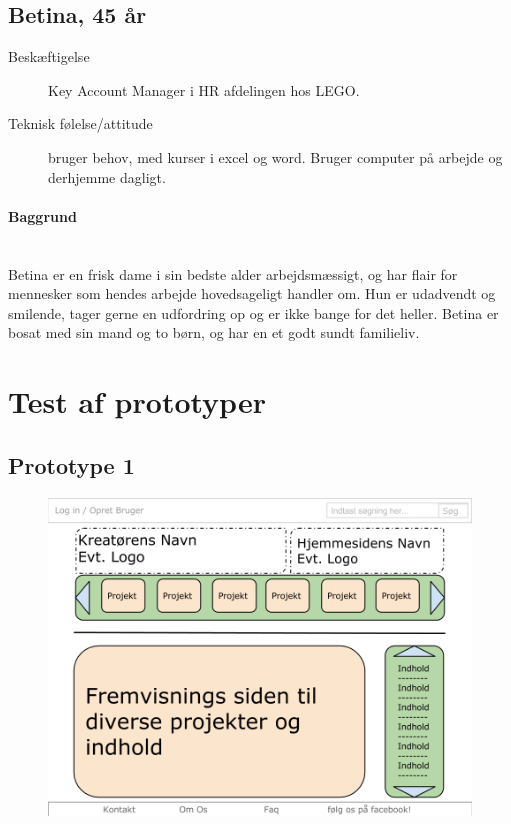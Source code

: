 \documentclass[a4paper,titlepage,fleqn,12pt]{article}
\begin{document}
\subsection{Betina, 45 år}
\begin{description}
	\item[Beskæftigelse] Key Account Manager i HR afdelingen hos LEGO. \item[Teknisk følelse/attitude] bruger behov, med kurser i excel og word. Bruger computer på arbejde og derhjemme dagligt.
\end{description}
\paragraph{Baggrund}\hfill\\
Betina er en frisk dame i sin bedste alder arbejdsmæssigt, og har flair for mennesker som hendes arbejde hovedsageligt handler om. Hun er udadvendt og smilende, tager gerne en udfordring op og er ikke bange for det heller. Betina er bosat med sin mand og to børn, og har en et godt sundt familieliv.

\section{Test af prototyper}

\subsection{Prototype 1}

\begin{figure}[H]
	\includegraphics[width=\textwidth]{hjemmesidedesign1.png}
	
\end{figure}
\end{document}
